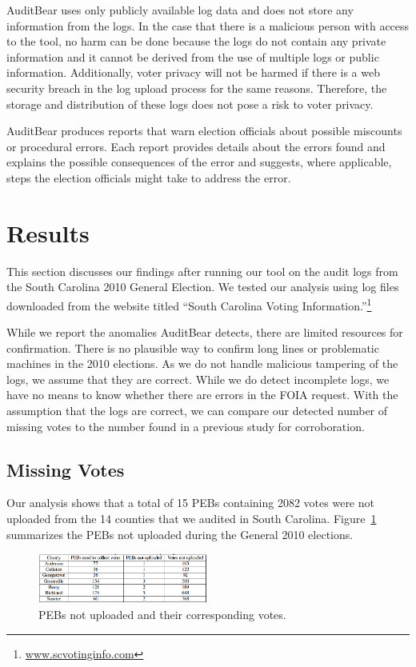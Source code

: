 \documentclass[letterpaper,twocolumn,10pt]{article}
\begin{document}
AuditBear uses only publicly available log data and does not store
any information from the logs. In the case that there 
is a malicious person with access to the tool, no harm can be done because the 
logs do not contain any private information and it cannot be derived from the 
use of multiple logs or public information.  Additionally, voter privacy will 
not be harmed if there is a web security breach in the log upload process for 
the same reasons.  Therefore, the storage and distribution of these logs does 
not pose a risk to voter privacy. 

AuditBear produces reports that warn election officials about possible miscounts
or procedural errors. Each report provides details about the errors found and
explains the possible consequences of the error and suggests, where applicable,
steps the election officials might take to address the error.

\section{Results}
This section discusses our findings after running our tool on the audit logs
from the South Carolina 2010 General Election. We tested our analysis using log
files downloaded from the website titled “South Carolina Voting
Information.”\footnote{\url{www.scvotinginfo.com}} 

While we report the anomalies AuditBear detects, there are limited resources for 
confirmation. There is no plausible way to confirm long lines or problematic 
machines in the 2010 elections. As we do not handle malicious tampering of the 
logs, we assume that they are correct. While we do detect incomplete logs, we 
have no means to know whether there are errors in the FOIA request. With the 
assumption that the logs are correct, we can compare our detected number of 
missing votes to the number found in a previous study for corroboration.  

\subsection{Missing Votes}
Our analysis shows that a total of 15 PEBs containing 2082 votes were not
uploaded from the 14 counties that we audited in South
Carolina. Figure~\ref{fig:pebs-not-uploaded} summarizes the PEBs not uploaded
during the General 2010 elections.  

\begin{figure}[htbp]
\begin{center}
    \includegraphics[width=0.5\textwidth,height=0.1\textheight]{PEBsNotUploaded1.eps}
\end{center}
\caption{PEBs not uploaded and their corresponding votes.}
\label{fig:pebs-not-uploaded}
\end{figure}
\end{document}
